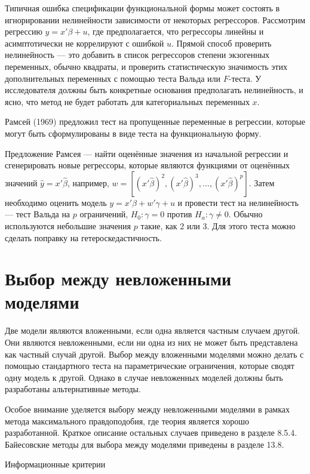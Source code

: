 Типичная ошибка  спецификации функциональной формы может состоять в игнорировании нелинейности зависимости от некоторых регрессоров. Рассмотрим регрессию $y = x'\beta + u$, где предполагается, что регрессоры линейны и асимптотически не коррелируют с ошибкой $u$. Прямой способ проверить нелинейность --- это добавить в список регрессоров степени экзогенных переменных, обычно квадраты,  и проверить статистическую значимость этих дополнительных переменных с помощью теста Вальда или $F$-теста. У исследователя должны быть конкретные основания предполагать нелинейность, и ясно, что метод не будет работать для категориальных переменных $x$.

Рамсей (1969) предложил тест на пропущенные переменные в регрессии, которые могут быть сформулированы в виде теста на функциональную форму. 

Предложение Рамсея --- найти оценённые значения из начальной регрессии и сгенерировать новые регрессоры, которые являются функциями от оценённых значений $\hat{y} = x'\hat{\beta}$, например, $w = [(x'\hat{\beta})^2, (x'\hat{\beta})^3, \dots, (x'\hat{\beta})^p]$. Затем необходимо оценить модель $y = x'\beta + w'\gamma + u $ и провести тест на нелинейность --- тест Вальда на $p$ ограничений, $H_0: \gamma = 0$ против $H_a: \gamma \not= 0$. Обычно используются небольшие значения $p$ такие, как 2 или 3. Для этого теста можно сделать поправку на  гетероскедастичность.

\section{Выбор между невложенными моделями}

Две модели являются вложенными, если одна является частным случаем другой. Они являются невложенными, если ни одна из них не может быть представлена как частный случай другой. Выбор между вложенными моделями можно делать с помощью стандартного теста на параметрические ограничения, которые сводят одну модель к другой. Однако в случае невложенных моделей должны быть разработаны альтернативные методы.

Особое внимание уделяется выбору между невложенными моделями в рамках метода максимального правдоподобия, где теория является хорошо разработанной. Краткое описание остальных случаев приведено в разделе 8.5.4. Байесовские методы для выбора между моделями приведены в разделе 13.8.

\begin{center}
Информационные критерии
\end{center}

